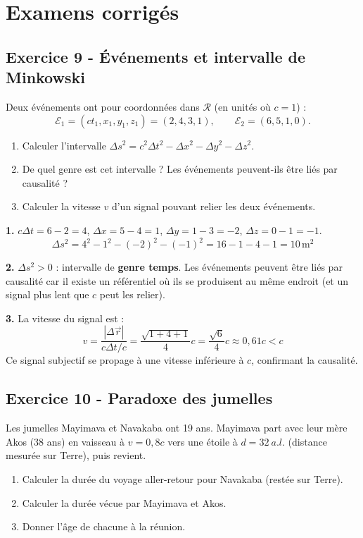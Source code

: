 \documentclass[12pt,a4paper]{article}
\begin{document}
\section{Examens corrigés}

\subsection*{Exercice 9 - Événements et intervalle de Minkowski \niveau{\moyen}}

\begin{boiteexercice}
Deux événements ont pour coordonnées dans $\mathcal{R}$ (en unités où $c=1$) :
\[
\mathcal{E}_1 = (ct_1, x_1, y_1, z_1) = (2, 4, 3, 1), \qquad \mathcal{E}_2 = (6, 5, 1, 0).
\]
\begin{enumerate}
  \item Calculer l'intervalle $\Delta s^2 = c^2\Delta t^2 - \Delta x^2 - \Delta y^2 - \Delta z^2$.
  \item De quel genre est cet intervalle ? Les événements peuvent-ils être liés par causalité ?
  \item Calculer la vitesse $v$ d'un signal pouvant relier les deux événements.
\end{enumerate}
\end{boiteexercice}

\begin{boitecorrige}
\textbf{1.} $c\Delta t = 6-2 = 4$, $\Delta x = 5-4 = 1$, $\Delta y = 1-3 = -2$, $\Delta z = 0-1 = -1$.
\[
\Delta s^2 = 4^2 - 1^2 - (-2)^2 - (-1)^2 = 16 - 1 - 4 - 1 = \boxed{10\,\text{m}^2}
\]

\textbf{2.} $\Delta s^2 > 0$ : intervalle de \textbf{genre temps}. Les événements peuvent être liés par causalité car il existe un référentiel où ils se produisent au même endroit (et un signal plus lent que $c$ peut les relier).

\textbf{3.} La vitesse du signal est :
\[
v = \frac{|\Delta\vec{r}|}{c\Delta t/c} = \frac{\sqrt{1+4+1}}{4}c = \frac{\sqrt{6}}{4}c \approx 0{,}61c < c
\]
Ce signal subjectif se propage à une vitesse inférieure à $c$, confirmant la causalité.
\end{boitecorrige}

\subsection*{Exercice 10 - Paradoxe des jumelles \niveau{\moyen}}

\begin{boiteexercice}
Les jumelles Mayimava et Navakaba ont 19 ans. Mayimava part avec leur mère Akos (38 ans) en vaisseau à $v = 0{,}8c$ vers une étoile à $d = \qty{32}{a.l.}$ (distance mesurée sur Terre), puis revient.
\begin{enumerate}
  \item Calculer la durée du voyage aller-retour pour Navakaba (restée sur Terre).
  \item Calculer la durée vécue par Mayimava et Akos.
  \item Donner l'âge de chacune à la réunion.
\end{enumerate}
\end{boiteexercice}
\end{document}
